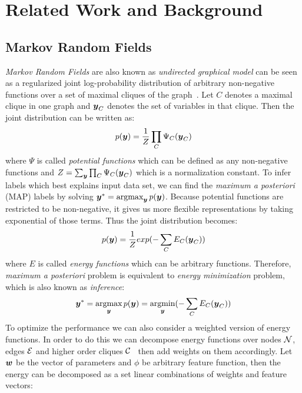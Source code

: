 

\section{Related Work and Background}
\label{sec:RelatedWorks}
\subsection{Markov Random Fields}
\label{sec:MRF}
\emph{Markov Random Fields} are also known as \emph{undirected
  graphical model} can be seen as a regularized joint
log-probability distribution of arbitrary non-negative functions
over a set of maximal cliques of the
graph~\cite{bishop:2006:PRML}. Let $C$ denotes a maximal clique
in one graph and ${\boldsymbol{y}}_C$ denotes the set of variables in that
clique. Then the joint distribution can be written as:
\begin{align}
  p({\boldsymbol{y}})=\frac{1}{Z}\prod_{C}{\Psi_C({\boldsymbol{y}}_C)}
\end{align}
\noindent where $\Psi$ is called \emph{potential functions} which
can be defined as any non-negative functions and
$Z=\sum_{{\boldsymbol{y}}}\prod_{C}{\Psi_C({\boldsymbol{y}}_C)}$ which is a normalization
constant. To infer labels which best explains input data set, we
can find the \emph{maximum a posteriori} (MAP) labels by solving
${\boldsymbol{y}}^*=\mathop{\textrm{argmax}}_{{\boldsymbol{y}}}p({\boldsymbol{y}})$. Because potential functions are
restricted to be non-negative, it gives us more flexible
representations by taking exponential of those terms. Thus the
joint distribution becomes:
\begin{align}
  p({\boldsymbol{y}})=\frac{1}{Z}exp(-\sum_{C}{E_C({\boldsymbol{y}}_C)})
\end{align}
\noindent where $E$ is called \emph{energy functions} which can be
arbitrary functions. Therefore, \emph{maximum a posteriori}
problem is equivalent to \emph{energy minimization} problem,
which is also known as \emph{inference}:
\begin{align}
  {\boldsymbol{y}}^*=\mathop{\textrm{argmax}}_{{\boldsymbol{y}}}p({\boldsymbol{y}})=\mathop{\textrm{argmin}}_{{\boldsymbol{y}}}(-\sum_{C}{E_C({\boldsymbol{y}}_C)})
\end{align}
To optimize the performance we can also consider a weighted
version of energy functions. In order to do this we can decompose
energy functions over nodes $\N$, edges $\E$ and higher order
cliques $\C$~\cite{Szummer:ECCV08} then add weights on them
accordingly. Let ${\boldsymbol{w}}$ be the vector of parameters and $\phi$ be
arbitrary feature function, then the energy can be decomposed as
a set linear combinations of weights and feature vectors:

